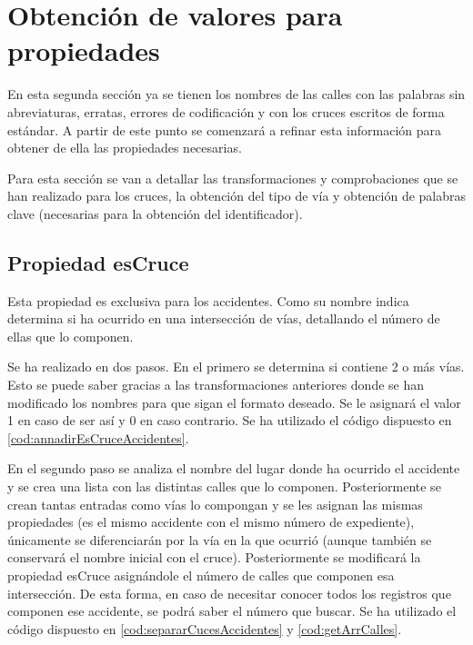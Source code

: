 \section{Obtención de valores para propiedades}

En esta segunda sección ya se tienen los nombres de las calles con las palabras sin abreviaturas, erratas, errores de codificación y con los cruces escritos de forma estándar. A partir de este punto se comenzará a refinar esta información para obtener de ella las propiedades necesarias.

Para esta sección se van a detallar las transformaciones y comprobaciones que se han realizado para los cruces, la obtención del tipo de vía y obtención de palabras clave (necesarias para la obtención del identificador).



\subsection{Propiedad esCruce}

Esta propiedad es exclusiva para los accidentes. Como su nombre indica determina si ha ocurrido en una intersección de vías, detallando el número de ellas que lo componen.

Se ha realizado en dos pasos. En el primero se determina si contiene 2 o más vías. Esto se puede saber gracias a las transformaciones anteriores donde se han modificado los nombres para que sigan el formato deseado. Se le asignará el valor 1 en caso de ser así y 0 en caso contrario. Se ha utilizado el código dispuesto en \ref{cod:annadirEsCruceAccidentes}.




En el segundo paso se analiza el nombre del lugar donde ha ocurrido el accidente y se crea una lista con las distintas calles que lo componen. Posteriormente se crean tantas entradas como vías lo compongan y se les asignan las mismas propiedades (es el mismo accidente con el mismo número de expediente), únicamente se diferenciarán por la vía en la que ocurrió (aunque también se conservará el nombre inicial con el cruce). Posteriormente se modificará la propiedad esCruce asignándole el número de calles que componen esa intersección. De esta forma, en caso de necesitar conocer todos los registros que componen ese accidente, se podrá saber el número que buscar. Se ha utilizado el código dispuesto en \ref{cod:separarCucesAccidentes} y \ref{cod:getArrCalles}.

